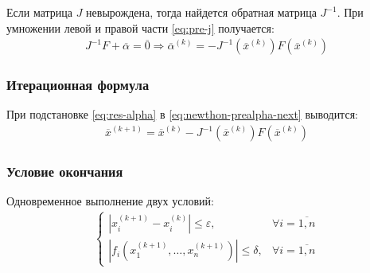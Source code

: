 Если матрица \(J\) невырождена, тогда найдется обратная матрица \(J^{-1}\). При умножении левой и правой части \cref{eq:pre-j} получается:
\begin{align}
	J^{-1} F + \overline{\alpha} = \overline{0} \Longrightarrow \overline{\alpha}^{(k)} = - J^{-1}(\overline{x}^{(k)})F(\overline{x}^{(k)}) \label{eq:res-alpha}
\end{align}

\subsubsection*{Итерационная формула}
При подстановке \cref{eq:res-alpha} в \cref{eq:newthon-prealpha-next} выводится:
\begin{align}\label{eq:newthon-res-iteration}
	\overline{x}^{(k+1)} = \overline{x}^{(k)}  - J^{-1}(\overline{x}^{(k)})F(\overline{x}^{(k)})
\end{align}

\subsubsection*{Условие окончания}
Одновременное выполнение двух условий:
\begin{align}
	\begin{cases}
		|x_i^{(k+1)} - x_i^{(k)}| \leq \varepsilon,       & \forall i = \overline{1,n} \\
		|f_i(x_1^{(k+1)},\dots,x_n^{(k+1)})| \leq \delta, & \forall i = \overline{1,n}
	\end{cases}
\end{align}

